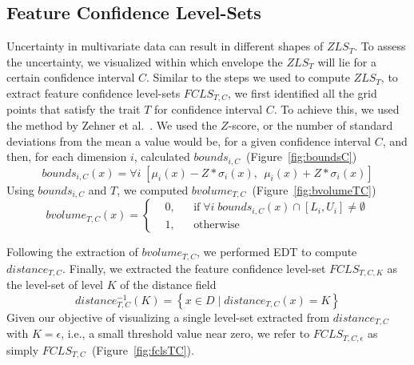 



\vspace{-1mm}
\subsection{Feature Confidence Level-Sets}
\label{sec:fcls}
%
Uncertainty in multivariate data can result in different shapes of $ZLS_{T}$.
%
To assess the uncertainty, we visualized within which envelope the $ZLS_{T}$ will lie for a certain confidence interval $C$.
%
Similar to the steps we used to compute $ZLS_{T}$, to extract feature confidence level-sets $FCLS_{T,C}$, we first identified all the grid points that satisfy the trait $T$ for confidence interval $C$.
%
To achieve this, we used the method by Zehner et al.~\cite{zehner2010visualization}. 
%
We used the $Z$-score, or the number of standard deviations from the mean a value would be, for a given confidence interval $C$, and then, for each dimension $i$, calculated $bounds_{i,C}$~(Figure~\ref{fig:boundsC})
\begin{equation}
bounds_{i,C}(x) = \forall i \; [{\mu}_{i}(x) - Z*{\sigma}_{i}(x),~~{\mu}_{i}(x) + Z*{\sigma}_{i}(x)]
\end{equation}
%
Using $bounds_{i,C}$ and $T$, we computed $bvolume_{T,C}$~(Figure~\ref{fig:bvolumeTC})
\begin{equation}
  bvolume_{T,C}(x) = \left \{
  \begin{aligned}
    &0, && \text{if}\; \forall i\; bounds_{i, C}(x) \cap [L_{i}, U_{i}] \neq \emptyset \\
    &1, && \text{otherwise}
  \end{aligned} \right.
\end{equation}
%

Following the extraction of $bvolume_{T,C}$, we performed EDT to compute $distance_{T,C}$.
%
Finally, we extracted the feature confidence level-set $FCLS_{T,C,K}$ as the level-set of level $K$ of the distance field
%
\begin{equation} 
distance_{T,C}^{-1}(K) = \left\{ x \in D\; |\; distance_{T,C}(x) = K\right\}
\end{equation}
%
Given our objective of visualizing a single level-set extracted from $distance_{T,C}$ with $K = \epsilon$, i.e., a small threshold value near zero, we refer to $FCLS_{T,C,\epsilon}$ as simply $FCLS_{T,C}$~(Figure~\ref{fig:fclsTC}).
%

